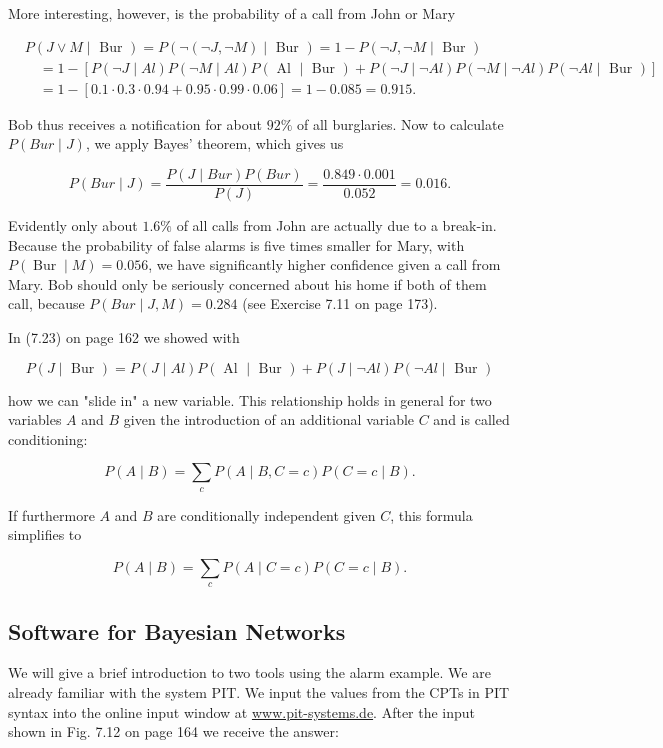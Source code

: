 \documentclass[10pt]{book}
\begin{document}
More interesting, however, is the probability of a call from John or Mary

$$
\begin{aligned}
& P(J \vee M \mid \text { Bur })=P(\neg(\neg J, \neg M) \mid \text { Bur })=1-P(\neg J, \neg M \mid \text { Bur }) \\
& \quad=1-[P(\neg J \mid A l) P(\neg M \mid A l) P(\text { Al } \mid \text { Bur })+P(\neg J \mid \neg A l) P(\neg M \mid \neg A l) P(\neg A l \mid \text { Bur })] \\
& \quad=1-[0.1 \cdot 0.3 \cdot 0.94+0.95 \cdot 0.99 \cdot 0.06]=1-0.085=0.915 .
\end{aligned}
$$

Bob thus receives a notification for about $92 \%$ of all burglaries. Now to calculate $P(B u r \mid J)$, we apply Bayes' theorem, which gives us

$$
P(B u r \mid J)=\frac{P(J \mid B u r) P(B u r)}{P(J)}=\frac{0.849 \cdot 0.001}{0.052}=0.016 .
$$

Evidently only about $1.6 \%$ of all calls from John are actually due to a break-in. Because the probability of false alarms is five times smaller for Mary, with $P(\operatorname{Bur} \mid M)=0.056$, we have significantly higher confidence given a call from Mary. Bob should only be seriously concerned about his home if both of them call, because $P(B u r \mid J, M)=0.284$ (see Exercise 7.11 on page 173).

In (7.23) on page 162 we showed with

$$
P(J \mid \text { Bur })=P(J \mid A l) P(\text { Al } \mid \text { Bur })+P(J \mid \neg A l) P(\neg A l \mid \text { Bur })
$$

how we can "slide in" a new variable. This relationship holds in general for two variables $A$ and $B$ given the introduction of an additional variable $C$ and is called conditioning:

$$
P(A \mid B)=\sum_{c} P(A \mid B, C=c) P(C=c \mid B) .
$$

If furthermore $A$ and $B$ are conditionally independent given $C$, this formula simplifies to

$$
P(A \mid B)=\sum_{c} P(A \mid C=c) P(C=c \mid B) .
$$

\subsection{Software for Bayesian Networks}
We will give a brief introduction to two tools using the alarm example. We are already familiar with the system PIT. We input the values from the CPTs in PIT syntax into the online input window at \href{http://www.pit-systems.de}{www.pit-systems.de}. After the input shown in Fig. 7.12 on page 164 we receive the answer:
\end{document}

